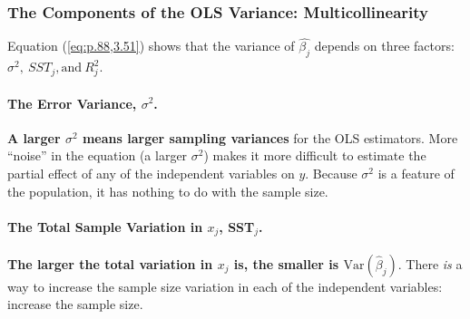 \documentclass[a4paper, 10pt]{article}
\theoremstyle{definition}	%
\begin{document}
\subsubsection{The Components of the OLS Variance: Multicollinearity}
Equation (\ref{eq:p.88,3.51}) shows that the variance of $\hat{\beta_j}$ depends on three factors: $\sigma^2,\ SST_j,\text{and}\ R_j^2$. 

\paragraph{The Error Variance, $\sigma^2$.} \textbf{A larger $\sigma^2$ means larger sampling variances} for the OLS estimators. More ``noise'' in the equation (a larger $\sigma^2$) makes it more difficult to estimate the partial effect of any of the independent variables on $y$. Because $\sigma^2$ is a feature of the population, it has nothing to do with the sample size.
\paragraph{The Total Sample Variation in $x_j$, SST$_j$.} \textbf{The larger the total variation in $x_j$ is, the smaller is $\text{Var}(\hat{\beta}_j)$}. There \textit{is} a way to increase the sample size variation in each of the independent variables: increase the sample size.
\end{document}

